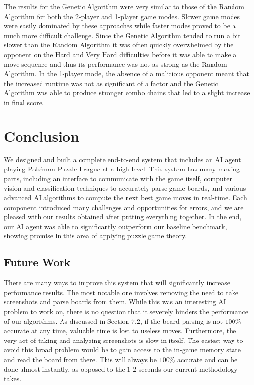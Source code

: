 \documentclass[12pt]{IEEEtran}
\begin{document}
The results for the Genetic Algorithm were very similar to those of the Random Algorithm for both the 2-player and 1-player game modes. Slower game modes were easily dominated by these approaches while faster modes proved to be a much more difficult challenge. Since the Genetic Algorithm tended to run a bit slower than the Random Algorithm it was often quickly overwhelmed by the opponent on the Hard and Very Hard difficulties before it was able to make a move sequence and thus its performance was not as strong as the Random Algorithm. In the 1-player mode, the absence of a malicious opponent meant that the increased runtime was not as significant of a factor and the Genetic Algorithm was able to produce stronger combo chains that led to a slight increase in final score.

\section{Conclusion}

We designed and built a complete end-to-end system that includes an AI agent playing Pok\'{e}mon Puzzle League at a high level. This system has many moving parts, including an interface to communicate with the game itself, computer vision and classification techniques to accurately parse game boards, and various advanced AI algorithms to compute the next best game moves in real-time. Each component introduced many challenges and opportunities for errors, and we are pleased with our results obtained after putting everything together. In the end, our AI agent was able to significantly outperform our baseline benchmark, showing promise in this area of applying puzzle game theory.

\subsection{Future Work}
There are many ways to improve this system that will significantly increase performance results. The most notable one involves removing the need to take screenshots and parse boards from them. While this was an interesting AI problem to work on, there is no question that it severely hinders the performance of our algorithms. As discussed in Section $7.2$, if the board parsing is not $100\%$ accurate at any time, valuable time is lost to useless moves. Furthermore, the very act of taking and analyzing screenshots is slow in itself. The easiest way to avoid this broad problem would be to gain access to the in-game memory state and read the board from there. This will always be $100\%$ accurate and can be done almost instantly, as opposed to the $1$-$2$ seconds our current methodology takes.
\end{document}
